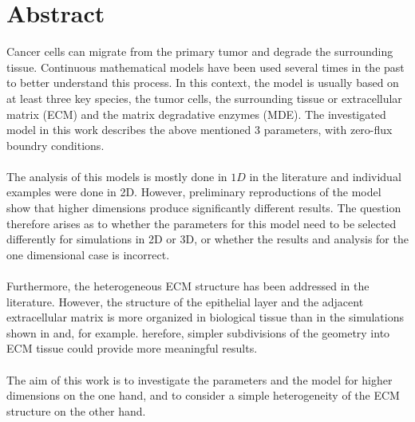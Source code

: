 \section*{Abstract}
Cancer cells can migrate from the primary tumor and degrade the surrounding tissue. Continuous mathematical models have been used several times in the past to better understand this process. In this context, the model is usually based on at least three key species, the tumor cells, the surrounding tissue or extracellular matrix (ECM) and the matrix degradative enzymes (MDE). The investigated model in this work describes the above mentioned 3 parameters, with zero-flux boundry conditions. \\ \\
The analysis of this models is mostly done in $1D$ in the literature and individual examples were done in 2D. However, preliminary reproductions of the model show that higher dimensions produce significantly different results. The question therefore arises as to whether the parameters for this model need to 
be selected differently for simulations in 2D or 3D, or whether the results and analysis for the one dimensional case is incorrect. \\ \\
Furthermore, the heterogeneous ECM structure has been addressed in the literature. However, the structure of the epithelial layer and the adjacent extracellular matrix is more organized in biological tissue than in the simulations shown in and, for example. herefore, simpler subdivisions of the geometry into ECM tissue could provide more meaningful results. \\ \\
The aim of this work is to investigate the parameters and the model for higher dimensions on the one hand, and to consider a simple heterogeneity of the ECM structure on the other hand.
